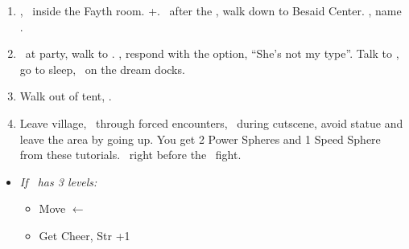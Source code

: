 \begin{enumerate}[resume]
    \item \cs[1:00], \sd\ inside the Fayth room. \fmv+\cs[1:00]. \sd\ after the \fmv, walk down to Besaid Center. \cs[1:40], name \valefor.
    \item \sd\ at party, walk to \yuna. \sd, respond with the  option, ``She's not my type''. Talk to \wakka, go to sleep, \sd\ on the dream docks.
    \item Walk out of tent, \sd.
    \item Leave village, \sd\ through forced encounters, \sd\ during cutscene, avoid statue and leave the area by going up. You get 2 Power Spheres and 1 Speed Sphere from these tutorials. \skippablefmv\ right before the \kimahri\ fight.
\end{enumerate}
\begin{spheregrid}
    \begin{itemize}
        \item \textit{If \tidus\ has 3 levels:}
        \begin{itemize}
            \item Move $\leftarrow$
            \item Get Cheer, Str +1
        \end{itemize}
    \end{itemize}
\end{spheregrid}
